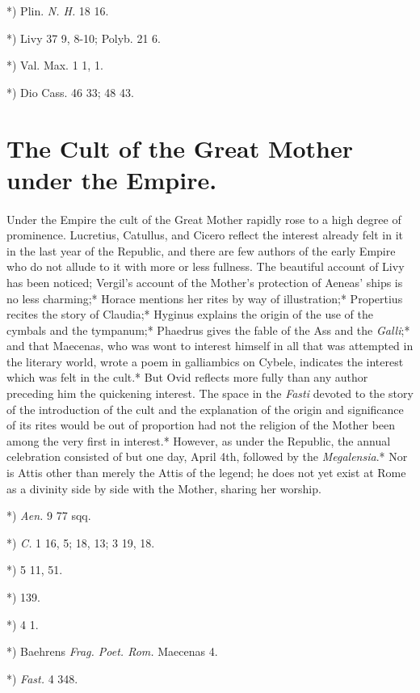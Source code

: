 \documentclass[a4paper, 11pt, oneside, polutonikogreek, english]{article}
\begin{document}
*) Plin. \emph{N. H.} 18 16.

*) Livy 37 9, 8-10; Polyb. 21 6.

*) Val. Max. 1 1, 1.

*) Dio Cass. 46 33; 48 43.

\section{The Cult of the Great Mother under the Empire.}
\paragraph{}
Under the Empire the cult of the Great Mother rapidly rose to a high degree of prominence. Lucretius, Catullus, and Cicero reflect the interest already felt in it in the last year of the Republic, and there are few authors of the early Empire who do not allude to it with more or less fullness. The beautiful account of Livy has been noticed; Vergil's account of the Mother's protection of Aeneas' ships is no less charming;* Horace mentions her rites by way of illustration;* Propertius recites the story of Claudia;* Hyginus explains the origin of the use of the cymbals and the tympanum;* Phaedrus gives the fable of the Ass and the \emph{Galli};* and that Maecenas, who was wont to interest himself in all that was attempted in the literary world, wrote a poem in galliambics on Cybele, indicates the interest which was felt in the cult.* But Ovid reflects more fully than any author preceding him the quickening interest. The space in the \emph{Fasti} devoted to the story of the introduction of the cult and the explanation of the origin and significance of its rites would be out of proportion had not the religion of the Mother been among the very first in interest.* However, as under the Republic, the annual celebration consisted of but one day, April 4th, followed by the \emph{Megalensia}.* Nor is Attis other than merely the Attis of the legend; he does not yet exist at Rome as a divinity side by side with the Mother, sharing her worship.

*) \emph{Aen.} 9 77 sqq.

*) \emph{C.} 1 16, 5; 18, 13; 3 19, 18.

*) 5 11, 51.

*) 139.

*) 4 1.

*) Baehrens \emph{Frag. Poet. Rom.} Maecenas 4.

*) \emph{Fast.} 4 348.
\end{document}
